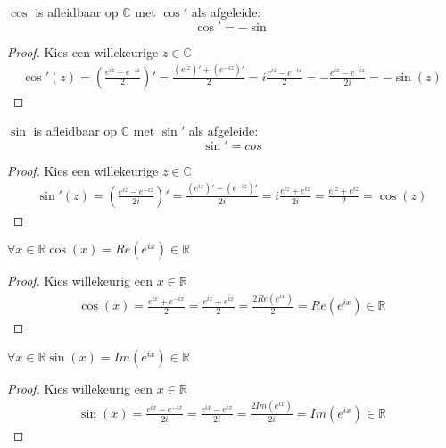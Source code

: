 \documentclass[main.tex]{subfiles}
\begin{document}
\begin{bpr}
  $\cos$ is afleidbaar op $\mathbb{C}$ met $\cos'$ als afgeleide:
  \[ \cos' = -\sin \]
  
  \begin{proof}
    Kies een willekeurige $z\in \mathbb{C}$
    \begin{align*}
      \cos'(z)
      = \left(\frac{e^{iz} + e^{-iz}}{2}\right)'
      = \frac{\left(e^{iz}\right)' + \left(e^{-iz}\right)'}{2}
      = i\frac{e^{iz} - e^{-iz}}{2}
      = -\frac{e^{iz} - e^{-iz}}{2i}
      = -\sin(z)
    \end{align*}
  \end{proof}
\end{bpr}

\begin{bpr}
  $\sin$ is afleidbaar op $\mathbb{C}$ met $\sin'$ als afgeleide:
  \[ \sin' = cos \]

  \begin{proof}
    Kies een willekeurige $z\in \mathbb{C}$
    \begin{align*}
      \sin'(z)
      = \left(\frac{e^{iz} - e^{-iz}}{2i}\right)'
      = \frac{\left(e^{iz}\right)' - \left(e^{-iz}\right)'}{2i}
      = i\frac{e^{iz}+e^{iz}}{2i}
      = \frac{e^{iz}+e^{iz}}{2}
      = \cos(z)
    \end{align*}
  \end{proof}
\end{bpr}

\begin{bpr}
  \label{pr:cos-van-reel-reel}
  $\forall x\in \mathbb{R} \cos(x) = Re(e^{ix}) \in \mathbb{R}$

  \begin{proof}
    Kies willekeurig een $x\in \mathbb{R}$
    \begin{align*}
      \cos(x)
      = \frac{e^{ix} + e^{-ix}}{2}
      = \frac{e^{ix} + \overline{e^{ix}}}{2}
      = \frac{2Re(e^{ix})}{2}
      = Re(e^{ix})
      \in \mathbb{R}
    \end{align*}
  \end{proof}
\end{bpr}

\begin{bpr}
  \label{pr:sin-van-reel-reel}
  $\forall x\in \mathbb{R} \sin(x) = Im(e^{ix}) \in \mathbb{R}$
  
  \begin{proof}
    Kies willekeurig een $x\in \mathbb{R}$
    \begin{align*}
      \sin(x)
      = \frac{e^{ix} - e^{-ix}}{2i}
      = \frac{e^{ix} - \overline{e^{ix}}}{2i}
      = \frac{2Im(e^{ix})}{2i}
      = Im(e^{ix})
      \in \mathbb{R}
    \end{align*}
  \end{proof}
\end{bpr}
\end{document}
